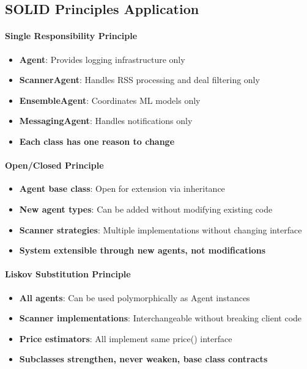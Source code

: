 \subsection{SOLID Principles Application}

\paragraph{Single Responsibility Principle \starfull\starfull\starfull\starfull\starfull}
\begin{itemize}
\item[\checkmark] \textbf{Agent}: Provides logging infrastructure only
\item[\checkmark] \textbf{ScannerAgent}: Handles RSS processing and deal filtering only
\item[\checkmark] \textbf{EnsembleAgent}: Coordinates ML models only
\item[\checkmark] \textbf{MessagingAgent}: Handles notifications only
\item[\checkmark] \textbf{Each class has one reason to change}
\end{itemize}

\paragraph{Open/Closed Principle \starfull\starfull\starfull\starfull\starempty}
\begin{itemize}
\item[\checkmark] \textbf{Agent base class}: Open for extension via inheritance
\item[\checkmark] \textbf{New agent types}: Can be added without modifying existing code
\item[\checkmark] \textbf{Scanner strategies}: Multiple implementations without changing interface
\item[\checkmark] \textbf{System extensible through new agents, not modifications}
\end{itemize}

\paragraph{Liskov Substitution Principle \starfull\starfull\starfull\starfull\starempty}
\begin{itemize}
\item[\checkmark] \textbf{All agents}: Can be used polymorphically as Agent instances
\item[\checkmark] \textbf{Scanner implementations}: Interchangeable without breaking client code
\item[\checkmark] \textbf{Price estimators}: All implement same price() interface
\item[\checkmark] \textbf{Subclasses strengthen, never weaken, base class contracts}
\end{itemize}

